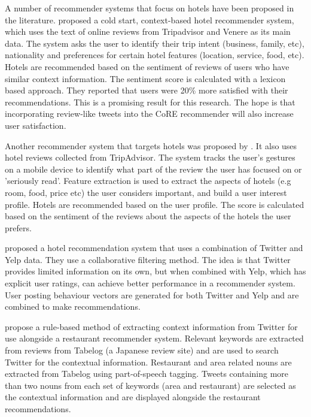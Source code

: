 A number of recommender systems that focus on hotels have been proposed in the literature. \cite{levi2012} proposed a cold start, context-based hotel recommender system, which uses the text of online reviews from Tripadvisor and Venere as its main data. The system asks the user to identify their trip intent (business, family, etc), nationality and preferences for certain hotel features (location, service, food, etc). Hotels are recommended based on the sentiment of reviews of users who have similar context information. The sentiment score is calculated with a lexicon based approach. They reported that users were 20\% more satisfied with their recommendations. This is a promising result for this research. The hope is that incorporating review-like tweets into the CoRE recommender will also increase user satisfaction. 

Another recommender system that targets hotels was proposed by \cite{lin2015}. It also uses hotel reviews collected from TripAdvisor. The system tracks the user's gestures on a mobile device to identify what part of the review the user has focused on or 'seriously read'. Feature extraction is used to extract the aspects of hotels (e.g room, food, price etc) the user considers important, and build a user interest profile. Hotels are recommended based on the user profile. The score is calculated based on the sentiment of the reviews about the aspects of the hotels the user prefers.

\cite{chang2018} proposed a hotel recommendation system that uses a combination of Twitter and Yelp data. They use a collaborative filtering method. The idea is that Twitter provides limited information on its own, but when combined with Yelp, which has explicit user ratings, can achieve better performance in a recommender system. User posting behaviour vectors are generated for both Twitter and Yelp and are combined to make recommendations.

\cite{takeharaContext2012} propose a rule-based method of extracting context information from Twitter for use alongside a restaurant recommender system. Relevant keywords are extracted from reviews from Tabelog (a Japanese review site) and are used to search Twitter for the contextual information. Restaurant and area related nouns are extracted from Tabelog using part-of-speech tagging. Tweets containing more than two nouns from each set of keywords (area and restaurant) are selected as the contextual information and are displayed alongside the restaurant recommendations.